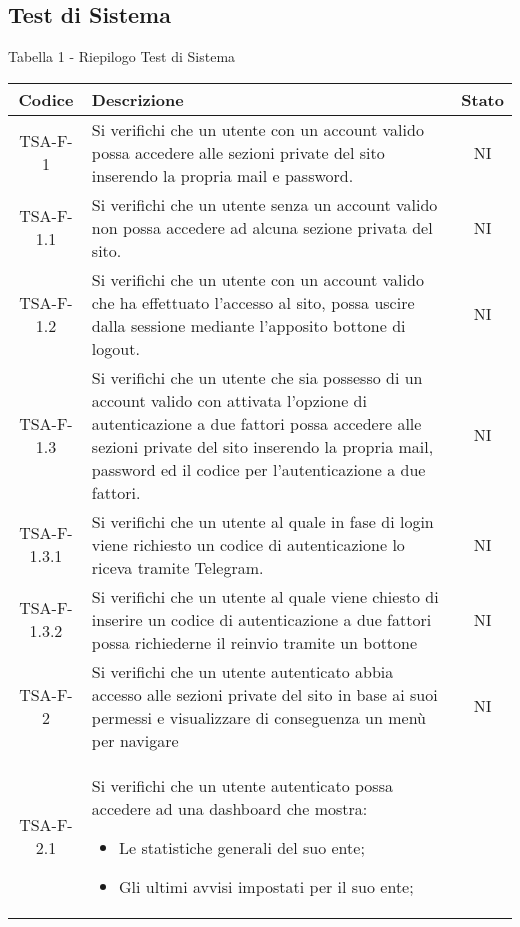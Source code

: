 	\subsection{Test di Sistema}
		\begin{center}
		Tabella 1 - Riepilogo Test di Sistema
			\begin{longtable}{|c|p{10cm}|c|}
			\hline
			\rowcolor{lighter-grayer}
			\textbf{Codice} & \textbf{Descrizione} & \textbf{Stato}  \\ %

			\hline
			\endhead

			\hline
			 TSA-F-1 & Si verifichi che un utente con un account valido possa accedere alle sezioni private del sito inserendo la propria mail e password.
			  & NI \\
			 \hline
			 TSA-F-1.1 & Si verifichi che un utente senza un account valido non possa accedere ad alcuna sezione privata del sito. & NI \\
			 \hline
			 TSA-F-1.2 & Si verifichi che un utente con un account valido che ha effettuato l'accesso al sito, possa uscire dalla sessione mediante l'apposito bottone di logout. & NI \\
			 \hline
			 TSA-F-1.3 & Si verifichi che un utente che sia possesso di un account valido con attivata l'opzione di autenticazione a due fattori possa accedere alle sezioni private del sito inserendo la propria mail, password ed il codice per l'autenticazione a due fattori. & NI \\
			 \hline
			 TSA-F-1.3.1 & Si verifichi che un utente al quale in fase di login viene richiesto un codice di autenticazione lo riceva tramite Telegram. & NI \\
			 \hline
			 TSA-F-1.3.2 & Si verifichi che un utente al quale viene chiesto di inserire un codice di autenticazione a due fattori possa richiederne il reinvio tramite un bottone & NI \\
			 \hline
			 TSA-F-2 & Si verifichi che un utente autenticato abbia accesso alle sezioni private del sito in base ai suoi permessi e visualizzare di conseguenza un menù per navigare & NI \\
			 \hline
			 TSA-F-2.1 & Si verifichi che un utente autenticato possa accedere ad una dashboard che mostra:
			 \begin{itemize}
			 	\item Le statistiche generali del suo ente;
			 	\item Gli ultimi avvisi impostati per il suo ente;

\end{itemize}
\end{longtable}
\end{center}
